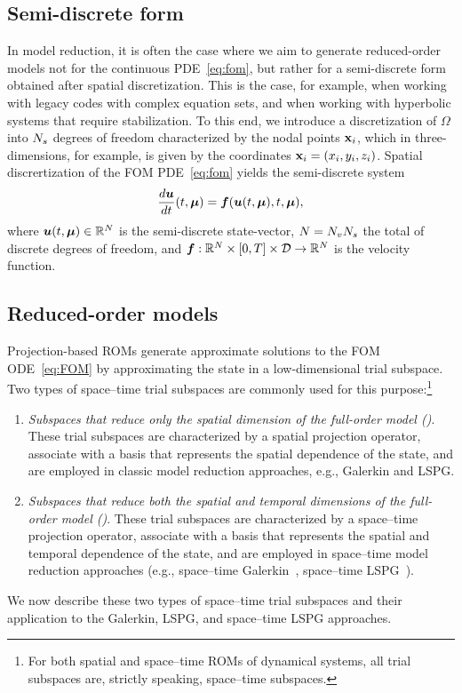 \documentclass[3p,computermodern,10pt]{elsarticle}
\begin{document}
\subsection{Semi-discrete form}
In model reduction, it is often the case where we aim to generate reduced-order models not for the continuous PDE~\eqref{eq:fom}, but rather for a semi-discrete form obtained after spatial discretization. This is the case, for example, when working with legacy codes with complex equation sets, and when working with hyperbolic systems that require stabilization. To this end, we introduce a discretization of $\Omega$ into $N_s$ degrees of freedom characterized by the nodal points $\mathbf{x}_i$, which in three-dimensions, for example, is given by the coordinates $\mathbf{x}_i = (x_i,y_i,z_i)$. Spatial discrertization of the FOM PDE~\eqref{eq:fom} yields the semi-discrete system  
$$\frac{d \boldsymbol u}{dt}(t,\boldsymbol \mu) = \boldsymbol f(\boldsymbol u(t,\boldsymbol \mu),t,\boldsymbol \mu),$$
where $\boldsymbol u(t,\boldsymbol \mu) \in \mathbb{R}^{N}$ is the semi-discrete state-vector, $N = N_v N_s$ the total of discrete degrees of freedom, and $\boldsymbol f: \mathbb{R}^{N} \times [0,T] \times \mathcal{D} \rightarrow \mathbb{R}^{N}$ is the velocity function.

 \subsection{Reduced-order models}
Projection-based ROMs generate approximate solutions to the FOM
	ODE~\eqref{eq:FOM} by approximating the state in a low-dimensional trial
	subspace. Two types of space--time trial subspaces are commonly used for
	this purpose:\footnote{For both spatial and space--time ROMs of dynamical systems, all trial subspaces are, strictly speaking, space--time subspaces.} 
\begin{enumerate} 
	\item \textit{Subspaces that reduce only the spatial dimension of the full-order
		model (\spatialAcronym)}. These trial subspaces are characterized by a spatial projection operator, associate with a basis that represents the spatial dependence of the state, and are employed in classic model reduction approaches, e.g., Galerkin and LSPG. %
	\item \textit{Subspaces that reduce both the spatial and temporal dimensions of the full-order
		model (\spaceTimeAcronym)}.
These trial subspaces are characterized by a space--time projection operator, associate with a basis that represents the spatial and temporal dependence of the state, and are employed in space--time 
model reduction approaches (e.g., space--time Galerkin~\cite{benner_st}, space--time LSPG~\cite{choi_stlspg}). 
\end{enumerate}
 We now describe these two types of space--time trial subspaces and their
	application to the Galerkin, LSPG, and space--time LSPG approaches. 
\end{document}

